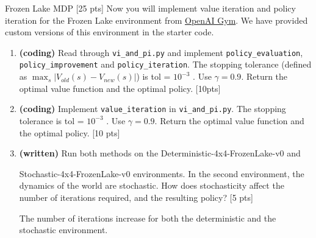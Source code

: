 \documentclass[11pt]{article}
\begin{document}
\begin{section}{Frozen Lake MDP [25 pts]}
Now you will implement value iteration and policy iteration for the Frozen Lake environment
from \href{"https://gym.openai.com/envs/FrozenLake-v0"}{OpenAI Gym}. We have provided
custom versions of this environment in the starter code.
\begin{enumerate}[label=(\alph*)]
\item \textbf{(coding)} Read through \texttt{vi\_and\_pi.py} and implement \texttt{policy\_evaluation}, \texttt{policy\_improvement} and \texttt{policy\_iteration}. The stopping tolerance (defined as $\max_s |V_{old}(s) - V_{new}(s)|$) is tol = $10^{-3}$
. Use $\gamma = 0.9$. Return the optimal value function and the optimal policy. [10pts]
\item \textbf{(coding)} Implement \texttt{value\_iteration} in \texttt{vi\_and\_pi.py}. The stopping tolerance is tol =
$10^{-3}$
. Use $\gamma = 0.9$. Return the optimal value function and the optimal policy. [10 pts]
\item \textbf{(written)} Run both methods on the Deterministic-4x4-FrozenLake-v0 and

Stochastic-4x4-FrozenLake-v0 environments. In the second environment, the dynamics of the world are stochastic. How does stochasticity affect the number of iterations required, and the resulting policy? [5 pts]

\begin{tcolorbox}[breakable]
  The number of iterations increase for both the deterministic and the stochastic environment.
\end{tcolorbox}

\end{enumerate}
\end{section}
\end{document}
